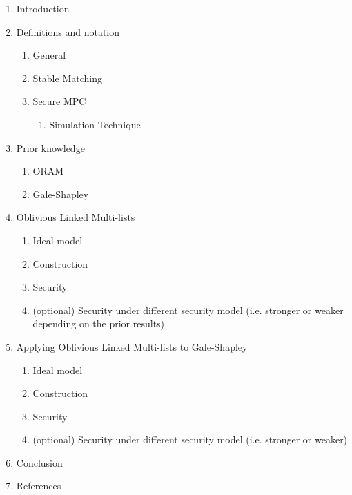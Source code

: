 \begin{enumerate}
  \item Introduction
  \item Definitions and notation
  \begin{enumerate}
    \item General
    \item Stable Matching
    \item Secure MPC
    \begin{enumerate}
    	\item Simulation Technique
    \end{enumerate}
  \end{enumerate}
  \item Prior knowledge
  \begin{enumerate}
    \item ORAM
    \item Gale-Shapley
  \end{enumerate}
  \item Oblivious Linked Multi-lists
  \begin{enumerate}
  	\item Ideal model
    \item Construction
    \item Security
    \item \color{gray}(optional) Security under different security model (i.e. stronger or weaker depending on the prior results)
  \end{enumerate}
  \item Applying Oblivious Linked Multi-lists to Gale-Shapley
  \begin{enumerate}
    \item Ideal model
    \item Construction
    \item Security
    \item \color{gray}(optional) Security under different security model (i.e. stronger or weaker)
  \end{enumerate}
  \item Conclusion
  \item References
\end{enumerate}